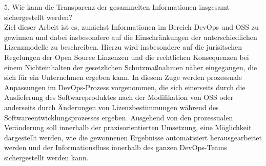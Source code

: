 

5. Wie kann die Transparenz der gesammelten Informationen insgesamt sichergestellt werden?\\ 


Ziel dieser Arbeit ist es, zunächst Informationen im Bereich DevOps und OSS zu gewinnen und dabei insbesondere auf die Einschränkungen der unterschiedlichen Lizenzmodelle zu beschreiben. Hierzu wird insbesondere auf die jurisitschen Regelungen der Open Source Linzenzen und die rechtlichen Konsequenzen bei einem Nichteinhalten der gesetzlichen Schutzmaßnahmen näher eingegangen, die sich für ein Unternehmen ergeben kann. In diesem Zuge werden prozessuale Anpassungen im DevOps-Prozess vorgenommen, die sich einerseits durch die Auslieferung des Softwareproduktes nach der Modifikation von OSS oder anderseits durch Änderungen von Lizenzbestimmungen während des Softwareentwicklungsprozesses ergeben. Ausgehend von den prozessualen Veränderung soll innerhalb der praxisorientierten Umsetzung, eine Möglichkeit dargestellt werden, wie die gewonnenen Ergebnisse automatisiert herausgearbeitet werden und der Informationsfluss innerhalb des ganzen DevOps-Teams sichergestellt werden kann.
 